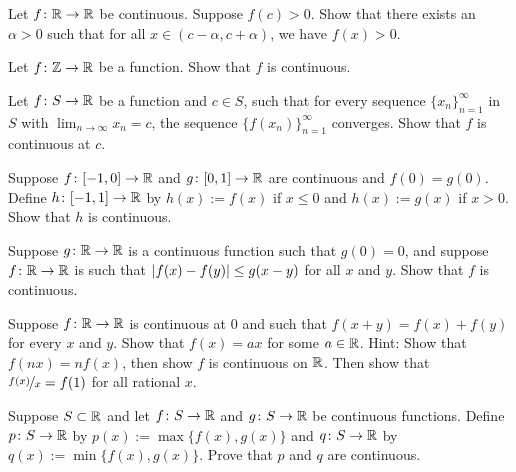 \begin{exercise} \label{exercise:positivecontneigh}
Let $f \colon {\mathbb{R}} \to {\mathbb{R}}$ be continuous.  Suppose $f(c) > 0$.  Show that
there exists an $\alpha > 0$ such that for all $x \in (c-\alpha,c+\alpha)$,
we have $f(x) > 0$.
\end{exercise}

\begin{exercise}
Let $f \colon {\mathbb{Z}} \to {\mathbb{R}}$ be a function.  Show that $f$ is continuous.
\end{exercise}

\begin{exercise} \label{exercise:contseqalt}
Let $f \colon S \to {\mathbb{R}}$ be a function and $c \in S$, such that for every
sequence $\{ x_n \}_{n=1}^\infty$ in $S$ with $\lim_{n\to\infty} x_n = c$, the sequence
$\bigl\{ f(x_n) \bigr\}_{n=1}^\infty$ converges.  Show that $f$ is continuous at $c$.
\end{exercise}

\begin{exercise}
Suppose $f \colon [-1,0] \to {\mathbb{R}}$ and $g \colon [0,1] \to {\mathbb{R}}$ are continuous
and $f(0) = g(0)$.  Define $h \colon [-1,1] \to {\mathbb{R}}$ by 
$h(x) := f(x)$ if $x \leq 0$ and $h(x) := g(x)$ if $x > 0$.  Show that
$h$ is continuous.
\end{exercise}

\begin{exercise}
Suppose $g \colon {\mathbb{R}} \to {\mathbb{R}}$ is a continuous function such that $g(0) = 0$,
and suppose $f \colon {\mathbb{R}} \to {\mathbb{R}}$ is such that
$\left\lvert {f(x)-f(y)} \right\rvert \leq g(x-y)$ for all $x$ and $y$.  Show that $f$ is
continuous.
\end{exercise}

\begin{exercise}[Challenging]
Suppose $f \colon {\mathbb{R}} \to {\mathbb{R}}$ is continuous at $0$ and
such that $f(x+y) = f(x) + f(y)$ for every $x$ and $y$.
Show that $f(x) = ax$ for some $a \in {\mathbb{R}}$.
Hint: Show that $f(nx) = nf(x)$, then show $f$ is continuous on ${\mathbb{R}}$.
Then show that $\nicefrac{f(x)}{x} = f(1)$ for all rational $x$.
\end{exercise}

\begin{exercise} \label{exercise:minmaxcont}
Suppose $S \subset {\mathbb{R}}$ and
let $f \colon S \to {\mathbb{R}}$ and
$g \colon S \to {\mathbb{R}}$ be continuous functions.
Define $p \colon S \to {\mathbb{R}}$ by
$p(x) := \max \bigl\{ f(x) , g(x) \bigr\}$ and
$q \colon S \to {\mathbb{R}}$ by
$q(x) := \min \bigl\{ f(x) , g(x) \bigr\}$.  Prove that $p$ and $q$ are
continuous.
\end{exercise}


